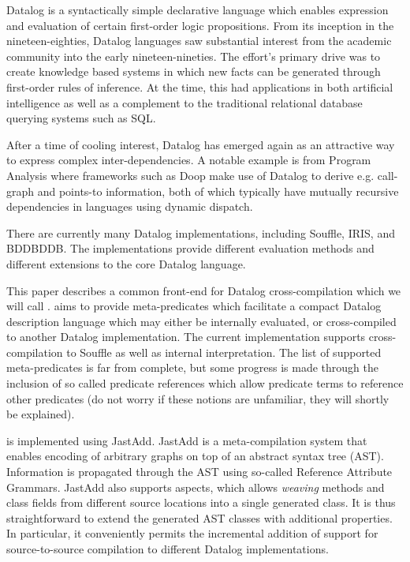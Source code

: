 Datalog is a syntactically simple declarative language which enables expression and evaluation of certain first-order logic propositions. From its inception in the nineteen-eighties, Datalog languages saw substantial interest from the academic community into the early nineteen-nineties\cite{Green:2013:DRQ:2688167.2688168}. The effort's primary drive was to create knowledge based systems in which new facts can be generated through first-order rules of inference. At the time, this had applications in both artificial intelligence as well as a complement to the traditional relational database querying systems such as SQL\cite{Ceri:1989:YAW:627272.627357}\cite{Bancilhon:1986:AIR:16894.16859}.

After a time of cooling interest, Datalog has emerged again as an attractive way to express complex inter-dependencies\cite{Green:2013:DRQ:2688167.2688168}. A notable example is from Program Analysis where frameworks such as Doop\cite{Smaragdakis:2010:UDF:2185923.2185939} make use of Datalog to derive e.g. call-graph and points-to information, both of which typically have mutually recursive dependencies in languages using dynamic dispatch. 

There are currently many Datalog implementations, including Souffle\cite{Scholz:2016:FLP:2892208.2892226}, IRIS\cite{Bishop_iris-integrated}, and BDDBDDB\cite{Whaley:2005:UDB:2099708.2099719}. The implementations provide different evaluation methods and different extensions to the core Datalog language. 

This paper describes a common front-end for Datalog cross-compilation which we will call \datalogM. \datalogM aims to provide meta-predicates which facilitate a compact Datalog description language which may either be internally evaluated, or cross-compiled to another Datalog implementation. The current implementation supports cross-compilation to Souffle as well as internal interpretation. The list of supported meta-predicates is far from complete, but some progress is made through the inclusion of so called predicate references which allow predicate terms to reference other predicates (do not worry if these notions are unfamiliar, they will shortly be explained).

\datalogM is implemented using JastAdd\cite{Ekman:2007:JEJ:1297105.1297029}. JastAdd is a meta-compilation system that enables encoding of arbitrary graphs on top of an abstract syntax tree (AST). Information is propagated through the AST using so-called Reference Attribute Grammars\cite{Ekman:2007:JEJ:1297105.1297029}. JastAdd also supports aspects, which allows \textit{weaving} methods and class fields from different source locations into a single generated class. It is thus straightforward to extend the generated AST classes with additional properties. In particular, it conveniently permits the incremental addition of support for source-to-source compilation to different Datalog implementations. 


